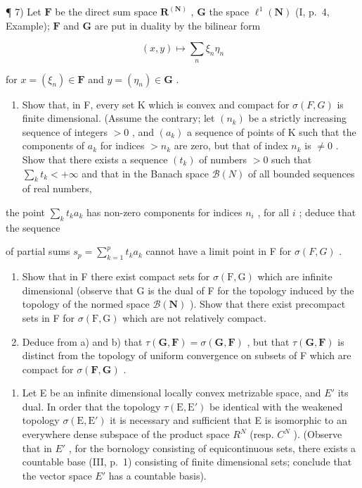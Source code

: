 ¶ 7) Let \(\mathbf{F}\) be the direct sum space \(\mathbf{R}^{(\mathbf{N})}\) , \(\mathbf{G}\) the space \(\ell^1 (\mathbf{N})\) (I, p.~4, Example); \(\mathbf{F}\) and \(\mathbf{G}\) are put in duality by the bilinear form

\[
(x, y) \mapsto \sum_ {n} \xi_ {n} \eta_ {n}
\]

for \(x = (\xi_n)\in \mathbf{F}\) and \(y = (\eta_{n})\in \mathbf{G}\) .

\begin{enumerate}
\def\labelenumi{\alph{enumi})}
\tightlist
\item
  Show that, in F, every set K which is convex and compact for \(\sigma(F, G)\) is finite dimensional. (Assume the contrary; let \((n_k)\) be a strictly increasing sequence of integers \(>0\) , and \((a_k)\) a sequence of points of K such that the components of \(a_k\) for indices \(>n_k\) are zero, but that of index \(n_k\) is \(\neq 0\) . Show that there exists a sequence \((t_k)\) of numbers \(>0\) such that \(\sum_{k} t_k < +\infty\) and that in the Banach space \(\mathcal{B}(N)\) of all bounded sequences of real numbers,
\end{enumerate}

the point \(\sum_{k} t_k a_k\) has non-zero components for indices \(n_i\) , for all \(i\) ; deduce that the sequence

of partial sums \(s_{p} = \sum_{k=1}^{p} t_k a_k\) cannot have a limit point in F for \(\sigma(F, G)\) .

\begin{enumerate}
\def\labelenumi{\alph{enumi})}
\setcounter{enumi}{1}
\item
  Show that in F there exist compact sets for \(\sigma(\mathrm{F},\mathrm{G})\) which are infinite dimensional (observe that G is the dual of F for the topology induced by the topology of the normed space \(\mathcal{B}(\mathbf{N})\) ). Show that there exist precompact sets in F for \(\sigma(\mathrm{F},\mathrm{G})\) which are not relatively compact.
\item
  Deduce from a) and b) that \(\tau(\mathbf{G},\mathbf{F})=\sigma(\mathbf{G},\mathbf{F})\) , but that \(\tau(\mathbf{G},\mathbf{F})\) is distinct from the topology of uniform convergence on subsets of F which are compact for \(\sigma(\mathbf{F},\mathbf{G})\) .
\end{enumerate}

\begin{enumerate}
\def\labelenumi{\arabic{enumi})}
\setcounter{enumi}{7}
\tightlist
\item
  Let E be an infinite dimensional locally convex metrizable space, and \(E'\) its dual. In order that the topology \(\tau(\mathrm{E}, \mathrm{E}')\) be identical with the weakened topology \(\sigma(\mathrm{E}, \mathrm{E}')\) it is necessary and sufficient that E is isomorphic to an everywhere dense subspace of the product space \(R^{N}\) (resp. \(C^{N}\) ). (Observe that in \(E'\) , for the bornology consisting of equicontinuous sets, there exists a countable base (III, p.~1) consisting of finite dimensional sets; conclude that the vector space \(E'\) has a countable basis).
\end{enumerate}

